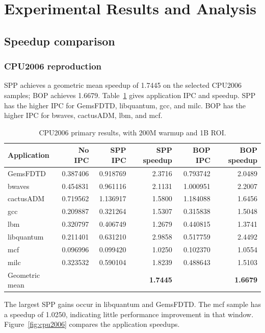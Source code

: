 \documentclass[a4paper,11pt]{article}
\begin{document}
\section{Experimental Results and Analysis}
\subsection{Speedup comparison}
\subsubsection{CPU2006 reproduction}
SPP achieves a geometric mean speedup of 1.7445 on the selected CPU2006 samples; BOP achieves 1.6679. Table~\ref{tab:cpu2006} gives application IPC and speedup. SPP has the higher IPC for GemsFDTD, libquantum, gcc, and milc. BOP has the higher IPC for bwaves, cactusADM, lbm, and mcf.

\begin{table}[htbp]
\centering\small
\caption{CPU2006 primary results, with 200M warmup and 1B ROI.}\label{tab:cpu2006}
\begin{tabular}{@{}lrrrrr@{}}
\toprule
Application & No IPC & SPP IPC & SPP speedup & BOP IPC & BOP speedup\\
\midrule
GemsFDTD & 0.387406 & 0.918769 & 2.3716 & 0.793742 & 2.0489\\
bwaves & 0.454831 & 0.961116 & 2.1131 & 1.000951 & 2.2007\\
cactusADM & 0.719562 & 1.136917 & 1.5800 & 1.184088 & 1.6456\\
gcc & 0.209887 & 0.321264 & 1.5307 & 0.315838 & 1.5048\\
lbm & 0.320797 & 0.406749 & 1.2679 & 0.440815 & 1.3741\\
libquantum & 0.211401 & 0.631210 & 2.9858 & 0.517759 & 2.4492\\
mcf & 0.096996 & 0.099420 & 1.0250 & 0.102370 & 1.0554\\
milc & 0.323532 & 0.590104 & 1.8239 & 0.488643 & 1.5103\\
\midrule
Geometric mean & & & \textbf{1.7445} & & \textbf{1.6679}\\
\bottomrule
\end{tabular}
\end{table}

The largest SPP gains occur in libquantum and GemsFDTD. The mcf sample has a speedup of 1.0250, indicating little performance improvement in that window. Figure~\ref{fig:cpu2006} compares the application speedups.
\end{document}
